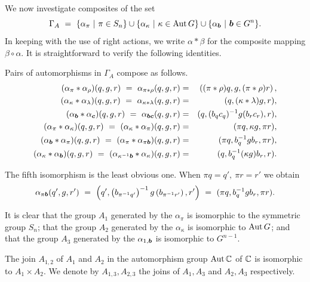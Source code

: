 \medskip
We now investigate composites of the set 
$$
\Gamma_A ~=~ \{\alpha_{\pi} ~|~ \pi \in S_n\} \cup 
             \{\alpha_{\kappa} ~|~ \kappa \in \mathrm{Aut}\,G\} \cup 
             \{\alpha_{\boldsymbol{b}} ~|~ \boldsymbol{b} \in G^n\}. 
$$
In keeping with the use of right actions, we write $\alpha*\beta$ 
for the composite mapping $\beta\circ\alpha$. 
It is straightforward to verify the following identities. 
\begin{lem} \label{lem:autopairs} 
Pairs of automorphisms in $\Gamma_A$ compose as follows.
\begin{eqnarray*}
(\alpha_{\pi}*\alpha_{\rho})(q,g,r) 
       ~=~  \alpha_{\pi*\rho}(q,g,r) 
  &=& \left( (\pi*\rho)q,g,(\pi*\rho)r \right), \\
(\alpha_{\kappa}*\alpha_{\lambda})(q,g,r) 
       ~=~  \alpha_{\kappa*\lambda}(q,g,r) 
  &=& (q,(\kappa*\lambda)g,r), \\
(\alpha_{\boldsymbol{b}}*\alpha_{\boldsymbol{c}})(q,g,r) 
       ~=~  \alpha_{\boldsymbol{b}\boldsymbol{c}}(q,g,r) 
  &=& (q,(b_qc_q)^{-1}g(b_rc_r),r), \\ 
(\alpha_{\pi}*\alpha{_\kappa})(q,g,r) 
       ~=~  (\alpha_{\kappa}*\alpha_{\pi})(q,g,r) 
  &=& (\pi q, \kappa g, \pi r), \\
(\alpha_{\boldsymbol{b}}*\alpha_{\pi})(q,g,r) 
       ~=~  (\alpha_{\pi}*\alpha_{\pi\boldsymbol{b}})(q,g,r) 
  &=& (\pi q, b_q^{-1}gb_r, \pi r), \\
(\alpha_{\kappa}*\alpha_{\boldsymbol{b}})(q,g,r) 
       ~=~  (\alpha_{\kappa^{-1}\boldsymbol{b}}*\alpha_{\kappa})(q,g,r) 
  &=& (q,b_q^{-1}(\kappa g)b_r,r). 
\end{eqnarray*}
\end{lem}
\begin{pf}
The fifth isomorphism is the least obvious one. 
When $\pi q = q',~ \pi r = r'$ we obtain  
$$
\alpha_{\pi\boldsymbol{b}}(q',g,r') ~=~ 
\left(q',\left(b_{\pi^{-1}q'}\right)^{-1}g\left(b_{\pi^{-1}r'}\right),r'\right)
~=~ (\pi q, b_q^{-1}gb_r,\pi r). 
$$
\end{pf}

It is clear that the group $A_1$ generated by the $\alpha_{\pi}$ 
is isomorphic to the symmetric group $S_n$; 
that the group $A_2$ generated by the $\alpha_{\kappa}$ 
is isomorphic to $\mathrm{Aut}\,G$; 
and that the group $A_3$ generated by the $\alpha_{1,\boldsymbol{b}}$ 
is isomorphic to $G^{n-1}$. 

The join $A_{1,2}$ of $A_1$ and $A_2$ in the 
automorphism group $\mathrm{Aut}\,\mathbb{C}$ of $\mathbb{C}$ is isomorphic to $A_1 \times A_2$.  
We denote by $A_{1,3},A_{2,3}$ the joins of $A_1,A_3$ and $A_2,A_3$ 
respectively. 

